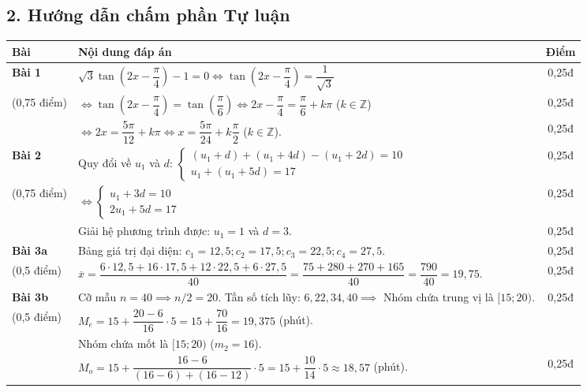\documentclass[12pt, a4paper]{article}
\begin{document}
\subsection*{2. Hướng dẫn chấm phần Tự luận}

\begin{center}
\begin{tabularx}{\linewidth}{|p{2.5cm}|X|c|}
\hline
\textbf{Bài} & \textbf{Nội dung đáp án} & \textbf{Điểm} \\
\hline
\textbf{Bài 1} & $\sqrt{3}\tan\left(2x - \dfrac{\pi}{4}\right) - 1 = 0 \iff \tan\left(2x - \dfrac{\pi}{4}\right) = \dfrac{1}{\sqrt{3}}$ & 0,25đ \\
\cline{2-3}
(0,75 điểm) & $\iff \tan\left(2x - \dfrac{\pi}{4}\right) = \tan\left(\dfrac{\pi}{6}\right) \iff 2x - \dfrac{\pi}{4} = \dfrac{\pi}{6} + k\pi$ ($k \in \mathbb{Z}$) & 0,25đ \\
\cline{2-3}
& $\iff 2x = \dfrac{5\pi}{12} + k\pi \iff x = \dfrac{5\pi}{24} + k\dfrac{\pi}{2}$ ($k \in \mathbb{Z}$). & 0,25đ \\
\hline
\textbf{Bài 2} & Quy đổi về $u_1$ và $d$: $\begin{cases} (u_1 + d) + (u_1 + 4d) - (u_1 + 2d) = 10 \\ u_1 + (u_1 + 5d) = 17 \end{cases}$ & 0,25đ \\
\cline{2-3}
(0,75 điểm) & $\iff \begin{cases} u_1 + 3d = 10 \\ 2u_1 + 5d = 17 \end{cases}$ & 0,25đ \\
\cline{2-3}
& Giải hệ phương trình được: $u_1 = 1$ và $d = 3$. & 0,25đ \\
\hline
\textbf{Bài 3a} & Bảng giá trị đại diện: $c_1 = 12{,}5; c_2 = 17{,}5; c_3 = 22{,}5; c_4 = 27{,}5$. & 0,25đ \\
\cline{2-3}
(0,5 điểm) & $\overline{x} = \dfrac{6 \cdot 12{,}5 + 16 \cdot 17{,}5 + 12 \cdot 22{,}5 + 6 \cdot 27{,}5}{40} = \dfrac{75 + 280 + 270 + 165}{40} = \dfrac{790}{40} = 19{,}75$. & 0,25đ \\
\hline
\textbf{Bài 3b} & Cỡ mẫu $n = 40 \implies n/2 = 20$. Tần số tích lũy: $6, 22, 34, 40 \implies$ Nhóm chứa trung vị là $[15; 20)$. & 0,25đ \\
\cline{2-3}
(0,5 điểm) & $M_e = 15 + \dfrac{20 - 6}{16} \cdot 5 = 15 + \dfrac{70}{16} = 19{,}375$ (phút).\\
& Nhóm chứa mốt là $[15; 20)$ ($m_2 = 16$).\\
& $M_o = 15 + \dfrac{16 - 6}{(16 - 6) + (16 - 12)} \cdot 5 = 15 + \dfrac{10}{14} \cdot 5 \approx 18{,}57$ (phút). & 0,25đ \\

\end{tabularx}
\end{center}
\end{document}
